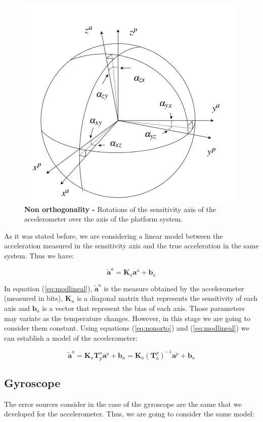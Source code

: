 \documentclass[conference]{IEEEtran}
\newcommand{\refp}[1]{(\ref{#1})}
\begin{document}
\begin{figure}
	\centering
	\includegraphics[width=.6\columnwidth]{./pics_paper/ejes_acc.jpg}
	\caption{\textbf{Non orthogonality -} Rotations of the sensitivity axis of the accelerometer over the axis of the platform system.}
	\label{fig:nonorto}
\end{figure}

As it was stated before, we are considering a linear model between the acceleration measured in the sensitivity axis and the true acceleration in the same system. Thus we have:

\begin{equation}
\tilde{\mathbf{a}}^a = \mathbf{K}_a\mathbf{a}^a + \mathbf{b}_a
\label{eq:modlineal}
\end{equation}

In equation \refp{eq:modlineal}, $\tilde{\mathbf{a}}^a$ is the measure obtained by the accelerometer (measured in bits), $\mathbf{K}_a$ is a diagonal matrix that represents the sensitivity of each axis and $\mathbf{b}_a$ is a vector that represent the bias of each axis. Those parameters may variate as the temperature changes. However, in this stage we are going to consider them constant. Using equations \refp{eq:nonorto} and \refp{eq:modlineal} we can establish a model of the accelerometer:

\begin{equation}
\tilde{\mathbf{a}}^a = \mathbf{K}_a\mathbf{T}_p^a\mathbf{a}^p + \mathbf{b}_a = \mathbf{K}_a(\mathbf{T}_a^p)^{-1}\mathbf{a}^p + \mathbf{b}_a 
\end{equation}


\subsection{Gyroscope}
The error sources consider in the case of the gyroscope are the same that we developed for the accelerometer. Thus, we are going to consider the same model:
\end{document}

